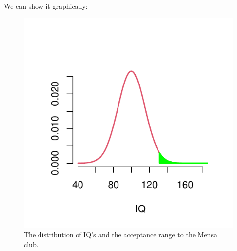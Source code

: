 We can show it graphically:
\begin{knitrout}
\color{fgcolor}\begin{kframe}
\begin{alltt}
 \hlkwb{<-} \hlstd{(}\hlstd{,}\hlstd{,} \hlstd{=}\hlstd{)}
  \hlstd{,} \hlstd{),} \hlstd{=}\hlstd{,} \hlstd{=}\hlstd{,} \hlstd{=}\hlstd{,}  \hlstd{=}\hlstd{,} \hlstd{=}\hlstd{)}
\hlstd{(}\hlstd{);} \hlstd{(}\hlstd{)}
 \hlkwb{<-} \hlstd{(}\hlstd{(}\hlstd{,} \hlstd{=} \hlstd{=} \hlstd{,} \hlstd{=}\hlstd{)}
 \hlkwb{<-}  \hlstd{,} \hlstd{)}
\hlstd{(}  \hlstd{(}\hlstd{(}\hlstd{,}  \hlstd{=}\hlstd{,} \hlstd{=}\hlstd{,} \hlstd{=}\hlstd{)}
\end{alltt}
\end{kframe}\begin{figure}

{\centering \includegraphics[width=\maxwidth]{figure/intro-lln5-8-1} 

}

\caption[The distribution of IQ's and the acceptance range to the Mensa club]{The distribution of IQ's and the acceptance range to the Mensa club.}\label{fig:intro-lln5-8}
\end{figure}

\end{knitrout}

